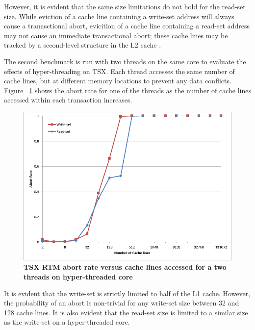 \documentclass[a4paper]{article}
\begin{document}
\indent 
However, it is evident that the same size limitations do not hold for
the read-set size.  While eviction of a cache line containing a write-set address will
always cause a tranasctional abort, evicition of a cache line containing a
read-set address may not cause an immediate transactional abort; these cache
lines may be tracked by a second-level structure in the L2 cache
\cite{intel_opt_man}.
\par

\indent 
The second benchmark is run with two threads on the same core to
evaluate the effects of hyper-threading on TSX.  Each thread accesses the same
number of cache lines, but at different memory locations to prevent any data
conflicts. Figure ~\ref{fig:trx_size_ht} shows the abort rate for one 
of the threads as the number of cache lines accessed within each transaction
increases.
\par

\begin{figure}[H]
    \centering
    \graphicspath{ {./figures/} }
    \includegraphics[width=\textwidth,height=\textheight,keepaspectratio]{trx_size_ht}
    \caption{\textbf{TSX RTM abort rate versus cache lines accessed for a two 
    threads on hyper-threaded core}}
    \label{fig:trx_size_ht}
\end{figure}

\indent 
It is evident that the write-set is strictly limited to half of the L1
cache.  However, the probability of an abort is non-trivial for any write-set
size between 32 and 128 cache lines.  It is also evident that the read-set size
is limited to a similar size as the write-set on a hyper-threaded core.
\par
\end{document}
